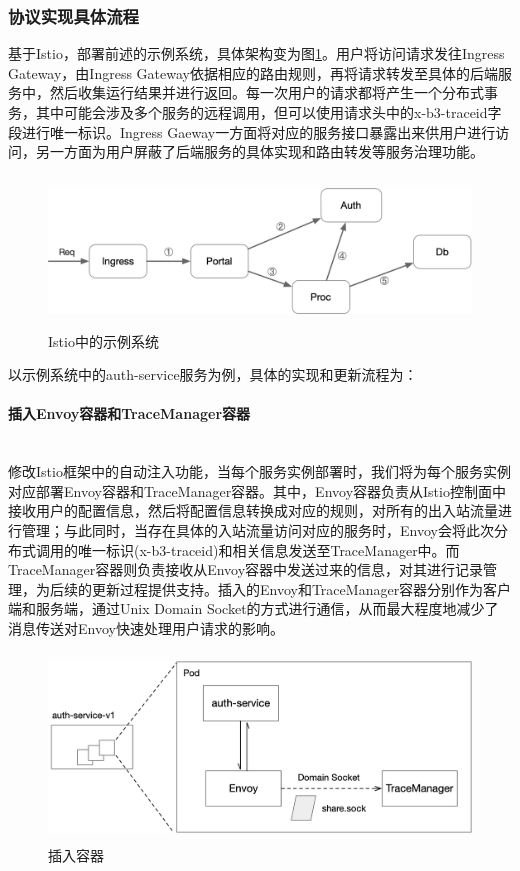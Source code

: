 \documentclass[a4paper, 12pt]{article}
\theoremstyle{definition}
\begin{document}
\subsubsection{协议实现具体流程}
基于Istio，部署前述的示例系统，具体架构变为图\ref{fig:demo_arch_on_istio}。用户将访问请求发往Ingress Gateway，由Ingress Gateway依据相应的路由规则，再将请求转发至具体的后端服务中，然后收集运行结果并进行返回。每一次用户的请求都将产生一个分布式事务，其中可能会涉及多个服务的远程调用，但可以使用请求头中的x-b3-traceid字段进行唯一标识。Ingress Gaeway一方面将对应的服务接口暴露出来供用户进行访问，另一方面为用户屏蔽了后端服务的具体实现和路由转发等服务治理功能。

\begin{figure}[!ht]
 \centering
 \includegraphics[height=4cm]{images/demo_arch_on_istio.png}
 \caption{Istio中的示例系统}
 \label{fig:demo_arch_on_istio}
\end{figure}

以示例系统中的auth-service服务为例，具体的实现和更新流程为：
\paragraph{插入Envoy容器和TraceManager容器}\mbox{}\\

修改Istio框架中的自动注入功能，当每个服务实例部署时，我们将为每个服务实例对应部署Envoy容器和TraceManager容器。其中，Envoy容器负责从Istio控制面中接收用户的配置信息，然后将配置信息转换成对应的规则，对所有的出入站流量进行管理；与此同时，当存在具体的入站流量访问对应的服务时，Envoy会将此次分布式调用的唯一标识(x-b3-traceid)和相关信息发送至TraceManager中。而TraceManager容器则负责接收从Envoy容器中发送过来的信息，对其进行记录管理，为后续的更新过程提供支持。插入的Envoy和TraceManager容器分别作为客户端和服务端，通过Unix Domain Socket的方式进行通信，从而最大程度地减少了消息传送对Envoy快速处理用户请求的影响。
\begin{figure}[!ht]
 \centering
 \includegraphics[height=5cm]{images/insert_containers.png}
 \caption{插入容器}
 \label{fig:insert_containers}
\end{figure}
\end{document}
